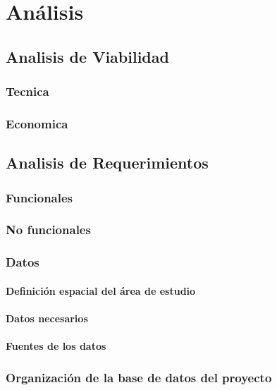 \chapter{Análisis}

\section{Analisis de Viabilidad}
\subsection{Tecnica}

\subsection{Economica}

\clearpage

\section{Analisis de Requerimientos}

\subsection{Funcionales}

\subsection{No funcionales}

\subsection{Datos}

\subsubsection{Definición espacial del área de estudio}

\subsubsection{Datos necesarios}

\subsubsection{Fuentes de los datos}

\subsection{Organización de la base de datos del proyecto}
\clearpage